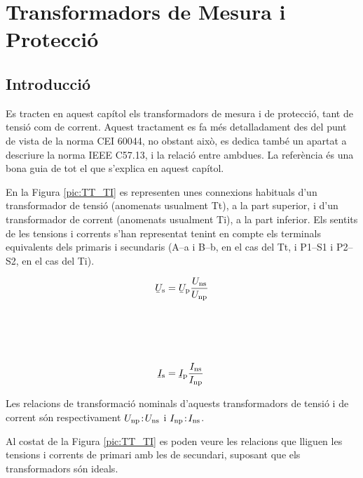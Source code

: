 \chapter{Transformadors de Mesura i Protecció}\label{sec:tr_mes_prot}


\section{Introducció}
Es tracten en aquest capítol els transformadors de
mesura i de protecció, tant de tensió com de corrent. Aquest
tractament es fa més detalladament des del punt de vista de la norma CEI 60044, no obstant això, es dedica també un
apartat a descriure la norma  IEEE C57.13, i la
relació entre ambdues. La referència \cite{KNU} és una bona guia de tot el que s'explica en aquest capítol.

En la Figura \vref{pic:TT_TI} es representen unes connexions
habituals d'un transformador de tensió (anomenats usualment Tt), a
la part superior, i d'un transformador de corrent (anomenats
usualment Ti), a la part inferior. Els sentits de les tensions
i corrents s'han representat tenint en compte els terminals
equivalents dels primaris i secundaris (\textsf{A--a} i \textsf{B--b}, en el cas del Tt, i \textsf{P1--S1} i \textsf{P2--S2}, en el cas del Ti).

\hfill
\begin{minipage}[b]{90mm}
    \hspace{1.5cm}
    
    \label{pic:TT_TI}
\end{minipage}
\hfill
\begin{minipage}[b][70mm][t]{50mm}
   \begin{align}
      \cmplx{U}\ped{s} &= \cmplx{U}\ped{p} \frac{U\ped{ns}}{U\ped{np}}
      \\[21mm]
      \cmplx{I}\ped{s} &= \cmplx{I}\ped{p} \frac{I\ped{ns}}{I\ped{np}}
   \end{align}
\end{minipage}

Les relacions de transformació nominals d'aquests transformadors de
tensió i de corrent són respectivament $U_\mathrm{np}\!:\!U_\mathrm{ns}$ i
$I_\mathrm{np}\!:\!I_\mathrm{ns}$.

Al costat de la Figura
\vref{pic:TT_TI} es poden veure les relacions que lliguen les
tensions i corrents de primari amb les de secundari, suposant que
els transformadors són ideals.


